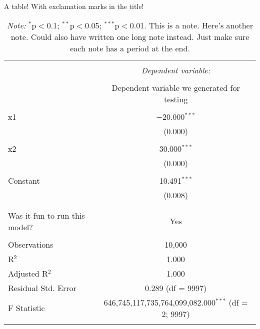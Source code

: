 \begin{table}[!h] \centering 
  \caption{A table! With exclamation marks in the title!} 
  \label{model_output_label_for_crossref}
  \footnotesize
\begin{tabular}{@{\extracolsep{5pt}}lc} 
\\[-1.8ex]\hline 
\hline \\[-1.8ex] 
 & \multicolumn{1}{c}{\textit{Dependent variable:}} \\ 
\cline{2-2} 
\\[-1.8ex] & Dependent variable we generated for testing \\ 
\hline \\[-1.8ex] 
 x1 & $-$20.000$^{***}$ \\ 
  & (0.000) \\ 
  & \\ 
 x2 & 30.000$^{***}$ \\ 
  & (0.000) \\ 
  & \\ 
 Constant & 10.491$^{***}$ \\ 
  & (0.008) \\ 
  & \\ 
\hline \\[-1.8ex] 
Was it fun to run this model? & Yes \\ 
\hline \\[-1.8ex] 
Observations & 10,000 \\ 
R$^{2}$ & 1.000 \\ 
Adjusted R$^{2}$ & 1.000 \\ 
Residual Std. Error & 0.289 (df = 9997) \\ 
F Statistic & 646,745,117,735,764,099,082.000$^{***}$ (df = 2; 9997) \\ 
\hline 
\hline \\[-1.8ex] 
\end{tabular} \\
\footnotesize
\caption*{\footnotesize \centering \textit{Note:} $^{*}$p$<$0.1; $^{**}$p$<$0.05; $^{***}$p$<$0.01. This is a note. Here's another note. Could also have written one long note instead. Just make sure each note has a period at the end.}
\end{table} 
